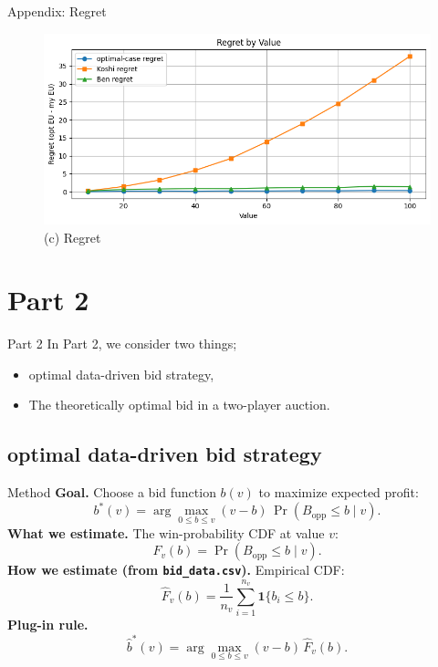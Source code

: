 \documentclass{beamer}
\begin{document}
\begin{frame}{Appendix: Regret}
    \begin{figure}
        \centering
        \includegraphics[width=1\linewidth]{332Project1/figures/regret.png}
    \vspace{0.4em}
    {\footnotesize (c) Regret}
    \end{figure}
\end{frame}

\section{Part 2}

\begin{frame}{Part 2}
    In Part 2, we consider two things; 
    \medskip
    \begin{itemize}
        \item optimal data-driven bid strategy, 
        \item The theoretically optimal bid in a two-player auction.
    \end{itemize}
\end{frame}

\subsection{optimal data-driven bid strategy}
\begin{frame}{Method}
\small
\textbf{Goal.} Choose a bid function $b(v)$ to maximize expected profit:
\[
b^*(v)=\arg\max_{0\le b\le v}(v-b)\,\Pr(B_{\text{opp}}\le b\mid v).
\]
\textbf{What we estimate.} The win-probability CDF at value $v$:
\[
F_v(b)=\Pr(B_{\text{opp}}\le b\mid v).
\]
\textbf{How we estimate (from \texttt{bid\_data.csv}).} Empirical CDF:
\[
\hat F_v(b)=\frac{1}{n_v}\sum_{i=1}^{n_v}\mathbf{1}\{b_i\le b\}.
\]
\textbf{Plug-in rule.}
\[
\hat b^*(v)=\arg\max_{0\le b\le v}(v-b)\,\hat F_v(b).
\]
\end{frame}
\end{document}
